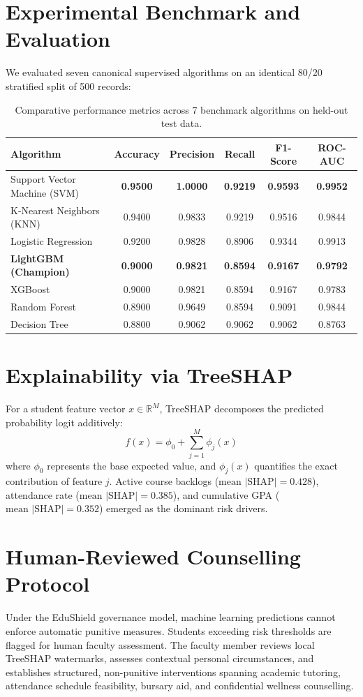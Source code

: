 \documentclass[runningheads]{llncs}
\begin{document}
\section{Experimental Benchmark and Evaluation}
We evaluated seven canonical supervised algorithms on an identical 80/20 stratified split of 500 records:
\begin{table}[h]
\centering
\caption{Comparative performance metrics across 7 benchmark algorithms on held-out test data.}
\begin{tabular}{lccccc}
\toprule
\textbf{Algorithm} & \textbf{Accuracy} & \textbf{Precision} & \textbf{Recall} & \textbf{F1-Score} & \textbf{ROC-AUC} \\
\midrule
Support Vector Machine (SVM) & \textbf{0.9500} & \textbf{1.0000} & \textbf{0.9219} & \textbf{0.9593} & \textbf{0.9952} \\
K-Nearest Neighbors (KNN) & 0.9400 & 0.9833 & 0.9219 & 0.9516 & 0.9844 \\
Logistic Regression & 0.9200 & 0.9828 & 0.8906 & 0.9344 & 0.9913 \\
\textbf{LightGBM (Champion)} & \textbf{0.9000} & \textbf{0.9821} & \textbf{0.8594} & \textbf{0.9167} & \textbf{0.9792} \\
XGBoost & 0.9000 & 0.9821 & 0.8594 & 0.9167 & 0.9783 \\
Random Forest & 0.8900 & 0.9649 & 0.8594 & 0.9091 & 0.9844 \\
Decision Tree & 0.8800 & 0.9062 & 0.9062 & 0.9062 & 0.8763 \\
\bottomrule
\end{tabular}
\end{table}

\section{Explainability via TreeSHAP}
For a student feature vector $x \in \mathbb{R}^M$, TreeSHAP decomposes the predicted probability logit additively:
\begin{equation}
f(x) = \phi_0 + \sum_{j=1}^M \phi_j(x)
\end{equation}
where $\phi_0$ represents the base expected value, and $\phi_j(x)$ quantifies the exact contribution of feature $j$. Active course backlogs ($\text{mean } |\text{SHAP}| = 0.428$), attendance rate ($\text{mean } |\text{SHAP}| = 0.385$), and cumulative GPA ($\text{mean } |\text{SHAP}| = 0.352$) emerged as the dominant risk drivers.

\section{Human-Reviewed Counselling Protocol}
Under the EduShield governance model, machine learning predictions cannot enforce automatic punitive measures. Students exceeding risk thresholds are flagged for human faculty assessment. The faculty member reviews local TreeSHAP watermarks, assesses contextual personal circumstances, and establishes structured, non-punitive interventions spanning academic tutoring, attendance schedule feasibility, bursary aid, and confidential wellness counselling.
\end{document}
